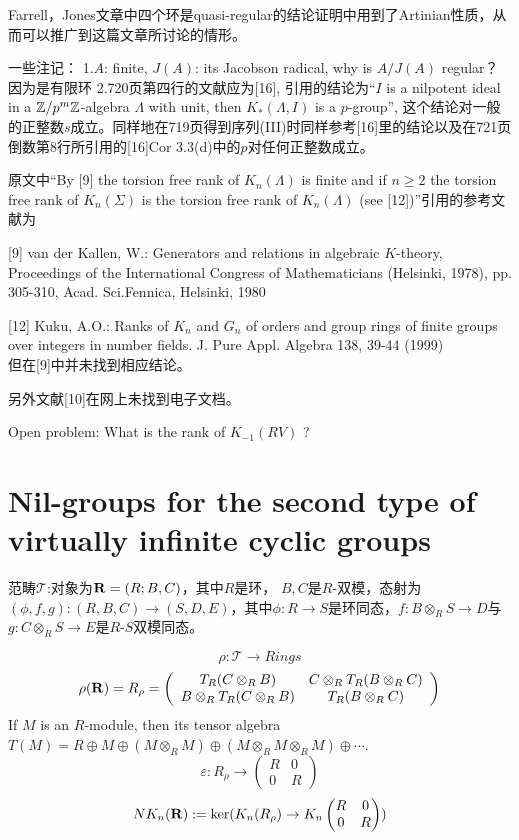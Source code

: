 \begin{remark}
Farrell，Jones文章中四个环是quasi-regular的结论证明中用到了Artinian性质，从而可以推广到这篇文章所讨论的情形。

一些注记： 1.$A$: finite, $J(A)$: its Jacobson radical, why is $A/J(A)$ regular？因为是有限环
2.720页第四行的文献应为[16], 引用的结论为“$I$ is a nilpotent ideal in a $\mathbb{Z}/p^m\mathbb{Z} $-algebra $\Lambda$ with unit, then $K_*(\Lambda, I)$ is a $p$-group”, 这个结论对一般的正整数$s$成立。同样地在719页得到序列(III)时同样参考[16]里的结论以及在721页倒数第8行所引用的[16]Cor 3.3(d)中的$p$对任何正整数成立。

原文中“By [9] the torsion
free rank of $K_n(\Lambda)$ is finite and if $n \geq 2$ the torsion free rank of $K_n(\Sigma)$ is the
torsion free rank of $K_n (\Lambda)$ (see [12])”引用的参考文献为

[9] van der Kallen, W.: Generators and relations in algebraic $K$-theory, Proceedings of the International Congress of Mathematicians (Helsinki, 1978), pp. 305-310, Acad. Sci.Fennica, Helsinki, 1980

[12] Kuku, A.O.: Ranks of $K_n$ and $G_n$ of orders and group rings of finite groups over integers in number fields. J. Pure Appl. Algebra 138, 39-44 (1999)\\
但在[9]中并未找到相应结论。

另外文献[10]在网上未找到电子文档。

Open problem: What is the rank of $K_{-1}(RV)$ ?

\end{remark}


\section{Nil-groups for the second type of virtually infinite cyclic groups}
范畴$\mathcal{T}$:对象为${\bf R}=(R;B,C)$，其中$R$是环， $B,C$是$R$-双模，态射为$(\phi,f,g):(R,B,C)\to (S,D,E) $，其中$\phi:R\to S $是环同态，$f: B \otimes_R S \to D  $与$g: C \otimes_R S \to E $是$R$-$S$双模同态。

 \[\rho:\mathcal{T}\longrightarrow Rings\]
 \begin{equation*}
  \rho({\bf R})=R_\rho = \left(
                     \begin{array}{cc}
                       T_R(C\otimes_R B) & C\otimes_R T_R(B\otimes_R C) \\
                       B\otimes_R T_R(C\otimes_R B) & T_R(B\otimes_R C) \\
                     \end{array}
                   \right)
\end{equation*}
If $M$ is an $R$-module, then its tensor algebra $T(M)=R\oplus M \oplus (M\otimes_R M)\oplus (M\otimes_R M\otimes_R M)\oplus \cdots$.
\[\varepsilon:R_\rho \longrightarrow \begin{pmatrix} R & 0 \\ 0 &  R \end{pmatrix}\]
\[NK_n({\bf R}):=\mbox{ker}(K_n(R_\rho)\to K_n\begin{pmatrix} R & 0 \\ 0 &  R \end{pmatrix})\]

